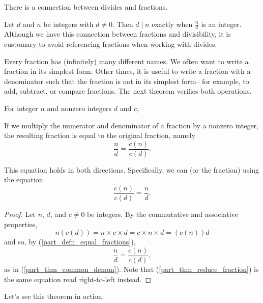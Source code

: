 There is a connection between divides and fractions.

\begin{rem} 
\label{rem_fractions_divides}
    Let $d$ and $n$ be integers with $d\neq 0$. Then $d \mid n$ exactly when $\frac{n}{d}$ is an integer.  Although we have this connection between fractions and divisibility, it is customary to avoid referencing fractions when working with divides.
\end{rem}

Every fraction has (infinitely) many different names.  We often want to write a fraction in its simplest form. Other times, it is useful to write a fraction with a denominator such that the fraction is not in its simplest form-- for example, to add, subtract, or compare fractions.  The next theorem verifies both operations.

\begin{thm}
\label{thm_equal_fractions}
    For integer $n$ and nonzero integers $d$ and $c$,    
    \begin{apart}
        \item \label{part_thm_common_denom} If we multiply the numerator and denominator of a fraction by a nonzero integer, the resulting fraction is equal to the original fraction, namely
        $$\frac{n}{d} =  \frac{c(n)}{c(d)}.$$ 

        \item \label{part_thm_reduce_fraction} This equation holds in both directions.  Specifically, we can  (or  the fraction) using the equation 
        $$\frac{c(n)}{c(d)}= \frac{n}{d}.$$
    \end{apart}     

    \begin{proof} Let $n$, $d$, and $c \neq 0$ be integers.  By the commutative and associative properties,
        $$
        n(c(d)) 
        = n \times c \times d 
        = c \times n \times d
        = (c(n))d
        $$
    and so, by  (\ref{part_defn_equal_fractions}), 
    $$\frac{n}{d} =  \frac{c(n)}{c(d)},$$ as in (\ref{part_thm_common_denom}).  Note that (\ref{part_thm_reduce_fraction}) is the same equation read right-to-left instead.      
    \end{proof}
\end{thm}

Let's see this theorem in action.

